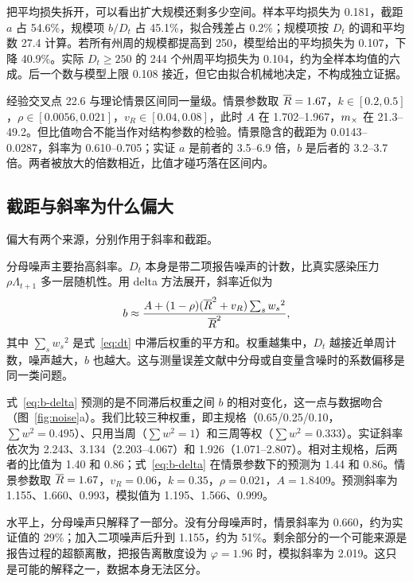 把平均损失拆开，可以看出扩大规模还剩多少空间。样本平均损失为 0.181，截距 $a$ 占 54.6\%，规模项 $b/D_t$ 占 45.1\%，拟合残差占 0.2\%；规模项按 $D_t$ 的调和平均数 27.4 计算。若所有州周的规模都提高到 250，模型给出的平均损失为 0.107，下降 40.9\%。实际 $D_t\geq250$ 的 244 个州周平均损失为 0.104，约为全样本均值的六成。后一个数与模型上限 0.108 接近，但它由拟合机械地决定，不构成独立证据。

经验交叉点 22.6 与理论情景区间同一量级。情景参数取 $\overline{R}=1.67$，$k\in[0.2,0.5]$\citep{lloydsmith2005superspreading}，$\rho\in[0.0056,0.021]$\citep{zhou2012hospitalizations, tokars2018seasonal}，$v_R\in[0.04,0.08]$，此时 $A$ 在 1.702--1.967，$m_{\times}$ 在 21.3--49.2。但比值吻合不能当作对结构参数的检验。情景隐含的截距为 0.0143--0.0287，斜率为 0.610--0.705；实证 $a$ 是前者的 3.5--6.9 倍，$b$ 是后者的 3.2--3.7 倍。两者被放大的倍数相近，比值才碰巧落在区间内。

\subsection{截距与斜率为什么偏大}
\label{sec:empirical-inflation}

偏大有两个来源，分别作用于斜率和截距。

分母噪声主要抬高斜率。$D_t$ 本身是带二项报告噪声的计数，比真实感染压力 $\rho\Lambda_{t+1}$ 多一层随机性。用 delta 方法展开，斜率近似为
\begin{equation}
  b\approx\frac{A+(1-\rho)(\overline{R}^2+v_R)\sum_s {w_s}^2}{\overline{R}^2},
  \label{eq:b-delta}
\end{equation}
其中 $\sum_s {w_s}^2$ 是式~\eqref{eq:dt} 中滞后权重的平方和。权重越集中，$D_t$ 越接近单周计数，噪声越大，$b$ 也越大。这与测量误差文献中分母或自变量含噪时的系数偏移是同一类问题\citep{fuller1987measurement, carroll2006measurement}。

式~\eqref{eq:b-delta} 预测的是不同滞后权重之间 $b$ 的相对变化，这一点与数据吻合（图~\ref{fig:noise}a）。我们比较三种权重，即主规格（0.65/0.25/0.10，$\sum w^2=0.495$）、只用当周（$\sum w^2=1$）和三周等权（$\sum w^2=0.333$）。实证斜率依次为 2.243、3.134（2.203--4.067）和 1.926（1.071--2.807）。相对主规格，后两者的比值为 1.40 和 0.86；式~\eqref{eq:b-delta} 在情景参数下的预测为 1.44 和 0.86。情景参数取 $\overline{R}=1.67$，$v_R=0.06$，$k=0.35$，$\rho=0.021$，$A=1.8409$。预测斜率为 1.155、1.660、0.993，模拟值为 1.195、1.566、0.999。

水平上，分母噪声只解释了一部分。没有分母噪声时，情景斜率为 0.660，约为实证值的 29\%；加入二项噪声后升到 1.155，约为 51\%。剩余部分的一个可能来源是报告过程的超额离散，把报告离散度设为 $\varphi=1.96$ 时，模拟斜率为 2.019。这只是可能的解释之一，数据本身无法区分。

